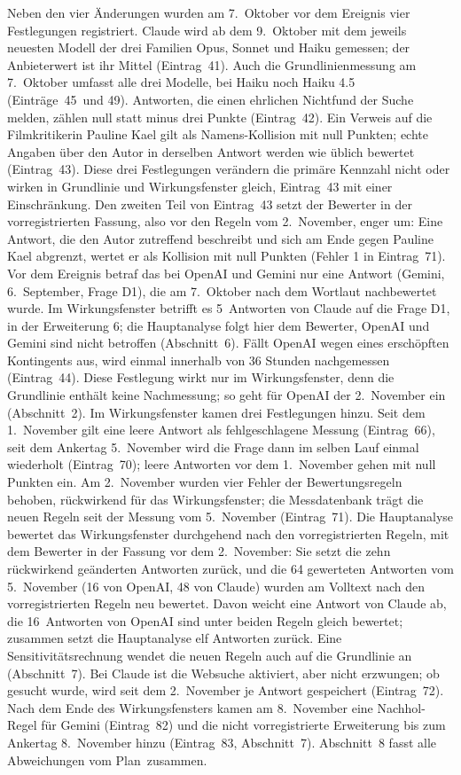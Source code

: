 \documentclass[11pt]{article}
\begin{document}
Neben den vier Änderungen wurden am 7.~Oktober vor dem Ereignis vier Festlegungen registriert. Claude wird ab dem 9.~Oktober mit dem jeweils neuesten Modell der drei Familien Opus, Sonnet und Haiku gemessen; der Anbieterwert ist ihr Mittel (Eintrag~41). Auch die Grundlinienmessung am 7.~Oktober umfasst alle drei Modelle, bei Haiku noch Haiku 4.5 (Einträge~45~und 49). Antworten, die einen ehrlichen Nichtfund der Suche melden, zählen null statt minus drei Punkte (Eintrag~42). Ein Verweis auf die Filmkritikerin Pauline Kael gilt als Namens-Kollision mit null Punkten; echte Angaben über den Autor in derselben Antwort werden wie üblich bewertet (Eintrag~43). Diese drei Festlegungen verändern die primäre Kennzahl nicht oder wirken in Grundlinie und Wirkungsfenster gleich, Eintrag~43 mit einer Einschränkung. Den zweiten Teil von Eintrag~43 setzt der Bewerter in der vorregistrierten Fassung, also vor den Regeln vom 2.~November, enger um: Eine Antwort, die den Autor zutreffend beschreibt und sich am Ende gegen Pauline Kael abgrenzt, wertet er als Kollision mit null Punkten (Fehler 1 in Eintrag~71). Vor dem Ereignis betraf das bei OpenAI und Gemini nur eine Antwort (Gemini, 6.~September, Frage D1), die am 7.~Oktober nach dem Wortlaut nachbewertet wurde. Im Wirkungsfenster betrifft es 5~Antworten von Claude auf die Frage D1, in der Erweiterung 6; die Hauptanalyse folgt hier dem Bewerter, OpenAI und Gemini sind nicht betroffen (Abschnitt~6). Fällt OpenAI wegen eines erschöpften Kontingents aus, wird einmal innerhalb von 36 Stunden nachgemessen (Eintrag~44). Diese Festlegung wirkt nur im Wirkungsfenster, denn die Grundlinie enthält keine Nachmessung; so geht für OpenAI der 2.~November ein (Abschnitt~2). Im Wirkungsfenster kamen drei Festlegungen hinzu. Seit dem 1.~November gilt eine leere Antwort als fehlgeschlagene Messung (Eintrag~66), seit dem Ankertag 5.~November wird die Frage dann im selben Lauf einmal wiederholt (Eintrag~70); leere Antworten vor dem 1.~November gehen mit null Punkten ein. Am 2.~November wurden vier Fehler der Bewertungsregeln behoben, rückwirkend für das Wirkungsfenster; die Messdatenbank trägt die neuen Regeln seit der Messung vom 5.~November (Eintrag~71). Die Hauptanalyse bewertet das Wirkungsfenster durchgehend nach den vorregistrierten Regeln, mit dem Bewerter in der Fassung vor dem 2.~November: Sie setzt die zehn rückwirkend geänderten Antworten zurück, und die 64 gewerteten Antworten vom 5.~November (16 von OpenAI, 48 von Claude) wurden am Volltext nach den vorregistrierten Regeln neu bewertet. Davon weicht eine Antwort von Claude ab, die 16~Antworten von OpenAI sind unter beiden Regeln gleich bewertet; zusammen setzt die Hauptanalyse elf Antworten zurück. Eine Sensitivitätsrechnung wendet die neuen Regeln auch auf die Grundlinie an (Abschnitt~7). Bei Claude ist die Websuche aktiviert, aber nicht erzwungen; ob gesucht wurde, wird seit dem 2.~November je Antwort gespeichert (Eintrag~72). Nach dem Ende des Wirkungsfensters kamen am 8.~November eine Nachhol-Regel für Gemini (Eintrag~82) und die nicht vorregistrierte Erweiterung bis zum Ankertag 8.~November hinzu (Eintrag~83, Abschnitt~7). Abschnitt~8 fasst alle Abweichungen vom Plan~\mbox{zusammen.}
\end{document}
